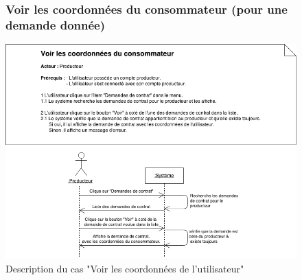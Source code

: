 \documentclass[12pt]{report}
\begin{document}
\begin{figure}[!h]
\centering
\subsubsection{Voir les coordonnées du consommateur (pour une demande donnée)~~~~~~~~~~~~~~~~~~~~~~~~~~~}
\includegraphics[width=1.\textwidth]{./ressources/desc_UC_coo_user.png}
\caption{Description du cas "Voir les coordonnées de l'utilisateur"}
\end{figure}
\clearpage
\end{document}
